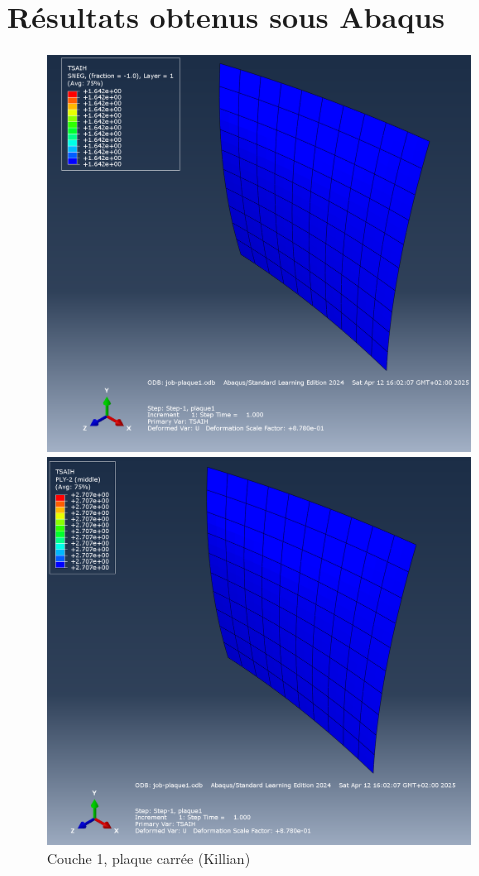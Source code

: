 \documentclass[a4paper,12pt]{article}
\begin{document}
\section{Résultats obtenus sous Abaqus}

\begin{figure}[h!]
	\centering
	\begin{minipage}[t][0.3\textheight]{0.495\textwidth}
		\centering
		\includegraphics[width=\textwidth]{media/K_P1_L1_12042025.png} %
		\caption{Couche 1, plaque carrée (Killian)}
		\label{fig:image1}
	\end{minipage}
	\hfill
	\begin{minipage}[t][0.3\textheight]{0.495\textwidth}
		\centering
		\includegraphics[width=\textwidth]{media/K_P1_L2_12042025.png} %

\end{minipage}
\end{figure}
\end{document}
